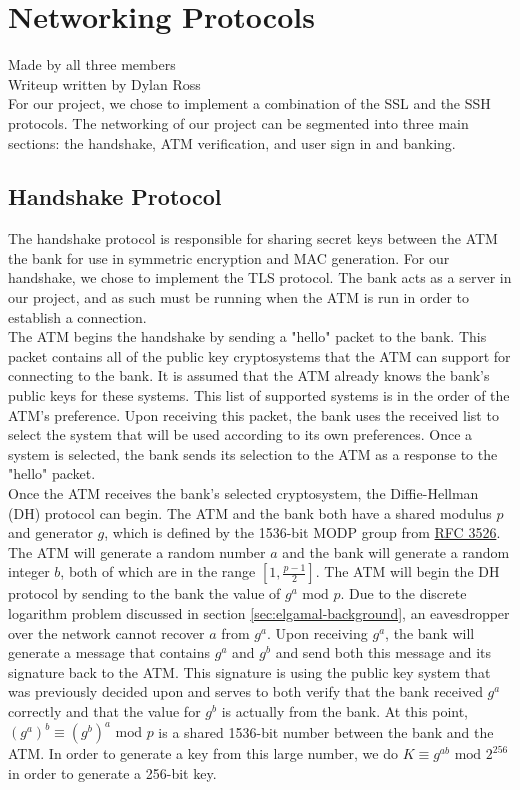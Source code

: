 \section{Networking Protocols}\label{sec:networking}
Made by all three members\\
Writeup written by Dylan Ross\\

	\medskip
	For our project, we chose to implement a combination of the SSL and the SSH protocols. The networking of our project can be segmented into three main sections: the handshake, ATM
	verification, and user sign in and banking.

	\subsection{Handshake Protocol}\label{sec:networking-handshake}
		The handshake protocol is responsible for sharing secret keys between the ATM the bank for use in symmetric encryption and MAC generation. For our handshake, we chose to implement the
		TLS protocol. The bank acts as a server in our project, and as such must be running when the ATM is run in order to establish a connection.\\

		The ATM begins the handshake by sending a "hello" packet to the bank. This packet contains all of the public key cryptosystems that the ATM can support for connecting to the bank. It
		is assumed that the ATM already knows the bank's public keys for these systems. This list of supported systems is in the order of the ATM's preference. Upon receiving this packet,
		the bank uses the received list to select the system that will be used according to its own preferences. Once a system is selected, the bank sends its selection to the ATM as a response
		to the "hello" packet.\\

		Once the ATM receives the bank's selected cryptosystem, the Diffie-Hellman (DH) protocol can begin. The ATM and the bank both have a shared modulus $p$ and generator $g$, which is defined
		by the 1536-bit MODP group from \href{https://www.ietf.org/rfc/rfc3526.txt}{RFC 3526}. The ATM will generate a random number $a$ and the bank will generate a random integer $b$, both of
		which are in the range $[1,\frac{p-1}{2}]$. The ATM will begin the DH protocol by sending to the bank the value of $g^a\text{ mod }p$. Due to the discrete logarithm problem discussed in
		section \ref{sec:elgamal-background}, an eavesdropper over the network cannot recover $a$ from $g^a$. Upon receiving $g^a$, the bank will generate a message that contains $g^a$ and $g^b$
		and send both this message and its signature back to the ATM. This signature is using the public key system that was previously decided upon and serves to both verify that the bank
		received $g^a$ correctly and that the value for $g^b$ is actually from the bank. At this point, $(g^a)^b\equiv(g^b)^a\text{ mod }p$ is a shared 1536-bit number between the bank and the
		ATM. In order to generate a key from this large number, we do $K\equiv g^{ab}\text{ mod }2^{256}$ in order to generate a 256-bit key.\\

